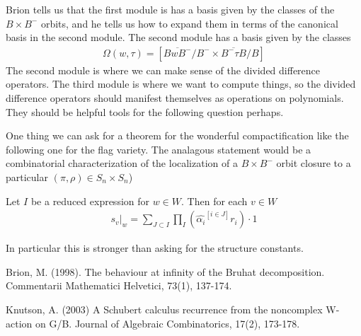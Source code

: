 \documentclass[12pt]{article}
\begin{document}
\hfill

Brion tells us that the first module is has a basis given by the classes of the $B\times B^-$ orbits,
and he tells us how to expand them in terms of the canonical basis in the second module.
The second module has a basis given by the classes \begin{align*}
    \Omega(w,\tau) = [\overline{BwB^-}/B^- \times \overline{B^-\tau B}/B]
\end{align*}
The second module is where we can make sense of the divided difference operators.
The third module is where we want to compute things, so the divided difference operators
should manifest themselves as operations on polynomials. They should be helpful tools for the following question perhaps.

\hfill

One thing we can ask for a theorem for the wonderful compactification like the following one for the flag variety.
The analagous statement would be a combinatorial characterization of
the localization of a $B\times B^-$ orbit closure to a particular $(\pi,\rho) \in S_n\times S_n$)

\begin{theorem}
    Let $I$ be a reduced expression for $w\in W$. Then for each $v\in W$ \begin{align*}
        s_v\vert_w = \sum_{J\subset I}\prod_I(\hat{\alpha_i}^{[i\in J]}r_i)\cdot 1
    \end{align*}
\end{theorem}
In particular this is stronger than asking for the structure constants.

\begin{thebibliography}{99}
    Brion, M. (1998). The behaviour at infinity of the Bruhat decomposition. Commentarii Mathematici Helvetici, 73(1), 137-174.

    Knutson, A. (2003) A Schubert calculus recurrence from the noncomplex W-action on G/B. Journal of Algebraic Combinatorics, 17(2), 173-178.
\end{thebibliography}
\end{document}
